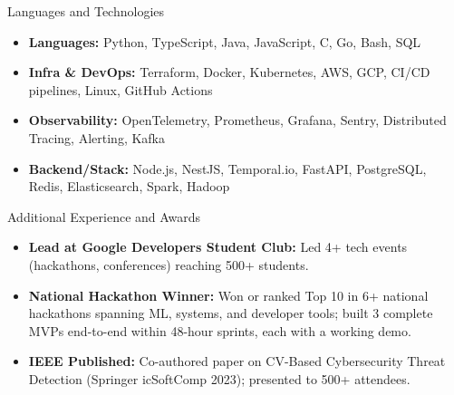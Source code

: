 \documentclass[]{mcdowellcv}
\begin{document}
\begin{cvsection}{Languages and Technologies}
  \begin{cvsubsection}{}{}{}
    \begin{itemize}
      \item \textbf{Languages:} Python, TypeScript, Java, JavaScript, C, Go, Bash, SQL
      \item \textbf{Infra \& DevOps:} Terraform, Docker, Kubernetes, AWS, GCP, CI/CD pipelines, Linux, GitHub Actions
      \item \textbf{Observability:} OpenTelemetry, Prometheus, Grafana, Sentry, Distributed Tracing, Alerting, Kafka
      \item \textbf{Backend/Stack:} Node.js, NestJS, Temporal.io, FastAPI, PostgreSQL, Redis, Elasticsearch, Spark, Hadoop
    \end{itemize}
  \end{cvsubsection}
\end{cvsection}

\begin{cvsection}{Additional Experience and Awards}
  \begin{cvsubsection}{}{}{}
    \begin{itemize}
      \item \textbf{Lead at Google Developers Student Club:} Led 4+ tech events (hackathons, conferences) reaching 500+ students.
      \item \textbf{National Hackathon Winner:} Won or ranked Top 10 in 6+ national hackathons spanning ML, systems, and developer tools; built 3 complete MVPs end-to-end within 48-hour sprints, each with a working demo.
      \item \textbf{IEEE Published:} Co-authored paper on CV-Based Cybersecurity Threat Detection (Springer icSoftComp 2023); presented to 500+ attendees.
    \end{itemize}
  \end{cvsubsection}
\end{cvsection}
\end{document}
